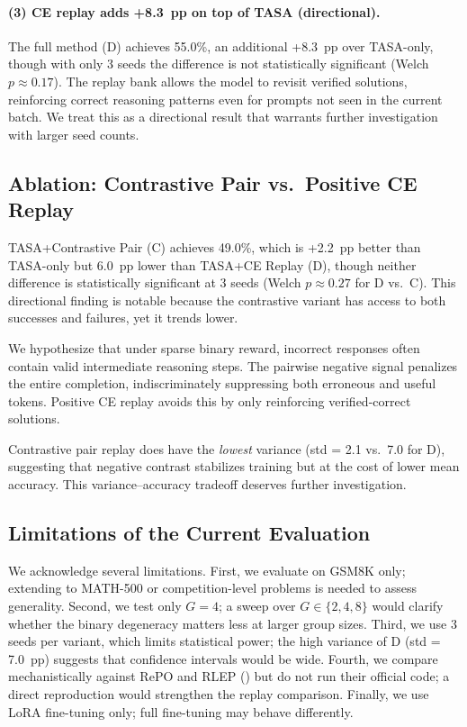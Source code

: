 \paragraph{(3) CE replay adds +8.3~pp on top of TASA (directional).}
The full method (D) achieves 55.0\%, an additional +8.3~pp over TASA-only, though with only 3 seeds the difference is not statistically significant (Welch $p \approx 0.17$).
The replay bank allows the model to revisit verified solutions, reinforcing correct reasoning patterns even for prompts not seen in the current batch.
We treat this as a directional result that warrants further investigation with larger seed counts.

\subsection{Ablation: Contrastive Pair vs.\ Positive CE Replay}
\label{sec:ablation}

TASA+Contrastive Pair (C) achieves 49.0\%, which is +2.2~pp better than TASA-only but 6.0~pp lower than TASA+CE Replay (D), though neither difference is statistically significant at 3 seeds (Welch $p \approx 0.27$ for D vs.\ C).
This directional finding is notable because the contrastive variant has access to both successes and failures, yet it trends lower.

We hypothesize that under sparse binary reward, incorrect responses often contain valid intermediate reasoning steps.
The pairwise negative signal penalizes the entire completion, indiscriminately suppressing both erroneous and useful tokens.
Positive CE replay avoids this by only reinforcing verified-correct solutions.

Contrastive pair replay does have the \emph{lowest} variance (std = 2.1 vs.\ 7.0 for D), suggesting that negative contrast stabilizes training but at the cost of lower mean accuracy.
This variance--accuracy tradeoff deserves further investigation.

\subsection{Limitations of the Current Evaluation}
\label{sec:exp_limitations}

We acknowledge several limitations.
First, we evaluate on GSM8K only; extending to MATH-500 or competition-level problems is needed to assess generality.
Second, we test only $G{=}4$; a sweep over $G \in \{2, 4, 8\}$ would clarify whether the binary degeneracy matters less at larger group sizes.
Third, we use 3 seeds per variant, which limits statistical power; the high variance of D (std = 7.0~pp) suggests that confidence intervals would be wide.
Fourth, we compare mechanistically against RePO and RLEP () but do not run their official code; a direct reproduction would strengthen the replay comparison.
Finally, we use LoRA fine-tuning only; full fine-tuning may behave differently.
